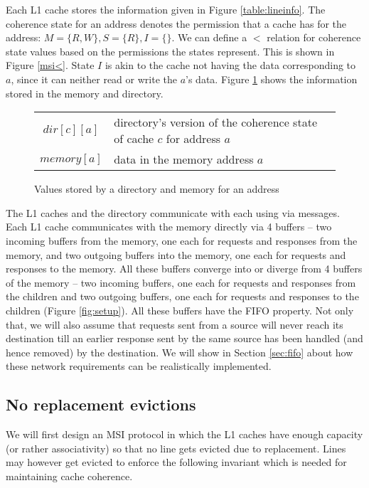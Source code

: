 Each L1 cache stores the information given in Figure \ref{table:lineinfo}. The
coherence state for an address denotes the permission that a cache has for the
address: $M = \{R, W\}, S = \{R\}, I = \{\}$. We can define a $<$ relation for
coherence state values based on the permissions the states represent. This is
shown in Figure \ref{msi<}. State $I$ is akin to the cache not having the data
corresponding to $a$, since it can neither read or write the $a$'s data. Figure
\ref{table:dirinfo} shows the information stored in the memory and directory. 

\begin{figure}
\begin{tabularx}{\linewidth}{|cX|}
\hline
$dir[c][a]$ & directory's version of the coherence state of cache $c$ for address $a$\\
$memory[a]$ & data in the memory address $a$\\
\hline
\end{tabularx}
\caption{Values stored by a directory and memory for an address}
\label{table:dirinfo}
\end{figure}

The L1 caches and the directory communicate with each using via messages. Each
L1 cache communicates with the memory directly via 4 buffers -- two incoming
buffers from the memory, one each for requests and responses from the memory,
and two outgoing buffers into the memory, one each for requests and responses to
the memory. All these buffers converge into or diverge from 4 buffers of the
memory -- two incoming buffers, one each for requests and responses from the
children and two outgoing buffers, one each for requests and responses to the
children (Figure \ref{fig:setup}). All these buffers have the FIFO property. Not
only that, we will also assume that requests sent from a source will never reach
its destination till an earlier response sent by the same source has been
handled (and hence removed) by the destination. We will show in Section
\ref{sec:fifo} about how these network requirements can be realistically
implemented.

\subsection{No replacement evictions}

We will first design an MSI protocol in which the L1 caches have enough
capacity (or rather associativity) so that no line gets evicted due to
replacement. Lines may however get evicted to enforce the following invariant
which is needed for maintaining cache coherence.

